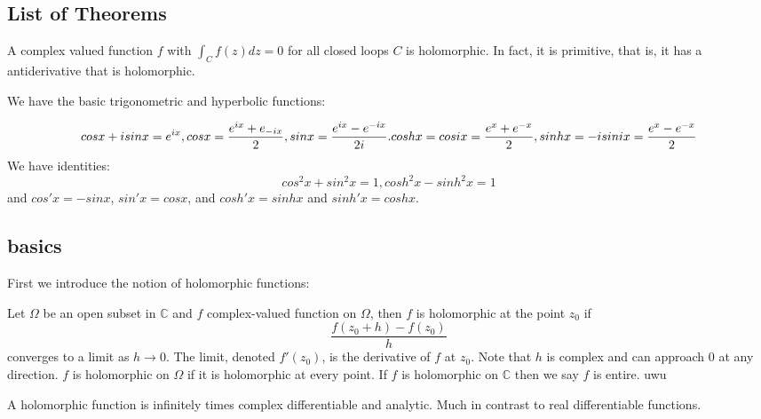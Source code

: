 \documentclass[main.tex]{subfiles}
\begin{document}
\subsection{List of Theorems}

\begin{theorem}
A complex valued function $f$ with $\int_C f(z) dz = 0$ for all closed loops $C$ is holomorphic. In fact, it is primitive, that is, it has a antiderivative that is holomorphic.
\end{theorem}


We have the basic trigonometric and hyperbolic functions:

$$
cos x + i sin x = e^{ix},\\
cos x = \frac{e^{ix} + e_{-ix}}{2},
sin x = \frac{e^{ix} - e^{-ix}}{2i}. \\
cosh x = cos ix = \frac{e^x + e^{-x}}{2},
sinh x = -i sin ix = \frac{e^{x} - e^{-x}}{2}
$$
We have identities:
$$
cos^2 x + sin^2 x = 1, cosh^2 x - sinh^2 x = 1
$$
and $cos' x = -sin x$, $ sin' x = cos x$, and $cosh' x = sinh x$ and $sinh' x = cosh x$.

\subsection{basics}

First we introduce the notion of holomorphic functions:

\begin{definition}
Let $\Omega$ be an open subset in $\mathbb{C}$ and $f$ complex-valued function on $\Omega$, then $f$ is holomorphic at the point $z_0$ if 
$$
\frac{f(z_0 + h) - f(z_0)}{h}
$$
converges to a limit as $h \rightarrow 0$. The limit, denoted $f'(z_0)$, is the derivative of $f$ at $z_0$. Note that $h$ is complex and can approach $0$ at any direction. $f$ is holomorphic on $\Omega$ if it is holomorphic at every point. If $f$ is holomorphic on $\mathbb{C}$ then we say $f$ is entire. uwu
\end{definition}

\begin{remark}
A holomorphic function is infinitely times complex differentiable and analytic. Much in contrast to real differentiable functions.
\end{remark}
\end{document}
